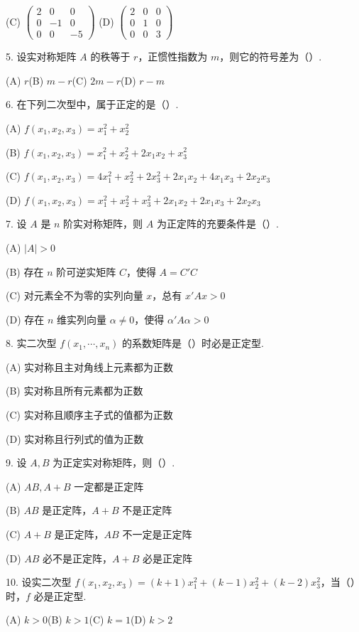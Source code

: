 \documentclass[UTF8, 12pt, fontset=fandol, oneside]{ctexart}
\begin{document}
(C) $\left(\begin{array}{ccc}2&0&0\\ 0&-1&0\\ 0&0&-5\end{array}\right)$
\qquad
(D) $\left(\begin{array}{ccc}2&0&0\\ 0&1&0\\ 0&0&3\end{array}\right)$

5. 设实对称矩阵 $A$ 的秩等于 $r$，正惯性指数为 $m$，则它的符号差为（\quad ）.

(A) $r$\qquad (B) $m-r$\qquad (C) $2m-r$\qquad (D) $r-m$

6. 在下列二次型中，属于正定的是（\quad ）.

(A) $f(x_1,x_2,x_3)=x_1^2+x_2^2$

(B) $f(x_1,x_2,x_3)=x_1^2+x_2^2+2x_1x_2+x_3^2$

(C) $f(x_1,x_2,x_3)=4x_1^2+x_2^2+2x_3^2+2x_1x_2+4x_1x_3+2x_2x_3$

(D) $f(x_1,x_2,x_3)=x_1^2+x_2^2+x_3^2+2x_1x_2+2x_1x_3+2x_2x_3$

7. 设 $A$ 是 $n$ 阶实对称矩阵，则 $A$ 为正定阵的充要条件是（\quad ）.

(A) $|A|>0$

(B) 存在 $n$ 阶可逆实矩阵 $C$，使得 $A=C'C$

(C) 对元素全不为零的实列向量 $x$，总有 $x'Ax>0$

(D) 存在 $n$ 维实列向量 $\alpha\ne 0$，使得 $\alpha'A\alpha>0$

8. 实二次型 $f(x_1,\cdots,x_n)$ 的系数矩阵是（\quad ）时必是正定型.

(A) 实对称且主对角线上元素都为正数

(B) 实对称且所有元素都为正数

(C) 实对称且顺序主子式的值都为正数

(D) 实对称且行列式的值为正数

9. 设 $A,B$ 为正定实对称矩阵，则（\quad ）.

(A) $AB,A+B$ 一定都是正定阵

(B) $AB$ 是正定阵，$A+B$ 不是正定阵

(C) $A+B$ 是正定阵，$AB$ 不一定是正定阵

(D) $AB$ 必不是正定阵，$A+B$ 必是正定阵

10. 设实二次型 $f(x_1,x_2,x_3)=(k+1)x_1^2+(k-1)x_2^2+(k-2)x_3^2$，当（\quad ）时，$f$ 必是正定型.

(A) $k>0$\qquad (B) $k>1$\qquad (C) $k=1$\qquad (D) $k>2$
\end{document}
